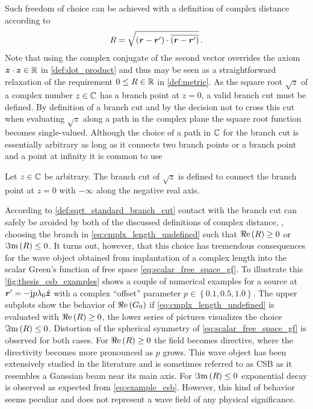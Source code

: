 Such freedom of choice can be achieved with a definition of complex distance
according to
\begin{equation}\label{eq:cmplx_length_undefined}
	R = \sqrt{\left(\rdiff\right) \cdot \overline{\left(\rdiff\right)}}
	\, .
\end{equation}
Note that using the complex conjugate of the second vector overrides the
axiom $\pvec{z} \cdot \pvec{z} \in \R$ in \cref{def:dot_product} and thus
may be seen as a straightforward relaxation of the requirement
$0 \leq R \in \mathbb{R}$ in \cref{def:metric}.
As the square root $\sqrt{z}$ of a complex number $z \in \mathbb{C}$ has a branch point
at $z = 0$, a valid branch cut must be defined.
By definition of a branch cut and by the decision not to cross this cut when
evaluating $\sqrt{z}$ along a path in the complex plane the square root function
becomes single-valued.
Although the choice of a path in $\mathbb{C}$ for the branch cut is essentially
arbitrary as long as it connects two branch points or a branch point and a
point at infinity it is common to use 
\cite[104]{Olver2010}\cite[\S\S2.2.3]{Chew1999}\cite[1066]{vanBladel2007}

\begin{definition}
	\label{def:sqrt_standard_branch_cut}
	Let $z \in \mathbb{C}$ be arbitrary.
	The branch cut of $\sqrt{z}$ is defined to connect the branch point at
	$z = 0$ with $-\infty$ along the negative real axis.
\end{definition}

According to \cref{def:sqrt_standard_branch_cut} contact with the branch cut can
safely be avoided by both of the discussed definitions of complex distance, \ie,
choosing the branch in \eqref{eq:cmplx_length_undefined} such that
$\Re\mathrm{e}\left(R\right) \geq 0$ or $\Im\mathrm{m}\left(R\right) \leq 0$.
It turns out, however, that this choice has tremendous consequences for the
wave object obtained from implantation of a complex length into the scalar
Green's function of free space \eqref{eq:scalar_free_space_gf}.
To illustrate this \cref{fig:thesis_csb_examples} shows a couple of numerical
examples for a source at $\rsrc = -\im p \lambda_0 \uv{z}$ with a complex
\enquote{offset} parameter 
$p \in \left\{\num{0.1}, \num{0.5}, \num{1.0}\right\}$.
The upper subplots show the behavior of $\Re\mathrm{e}\left(G_0\right)$ if
\eqref{eq:cmplx_length_undefined} is evaluated with $\Re\mathrm{e}\left(R\right) \geq 0$,
the lower series of pictures visualizes the choice $\Im\mathrm{m}\left(R\right) \leq 0$.
Distortion of the spherical symmetry of \eqref{eq:scalar_free_space_gf}
is observed for both cases.
For $\Re\mathrm{e}\left(R\right) \geq 0$ the field becomes directive, where the directivity
becomes more pronounced as $p$ grows.
This wave object has been extensively studied in the literature
\cite{Deschamps1971,Keller1971,Couture1981} and is sometimes referred to as
\ac{CSB} \cite{Hansen2009,Hansen2013} as it resembles a
Gaussian beam \cite[pp.~626]{hecht2017} near its main axis.
For $\Im\mathrm{m}\left(R\right) \leq 0$ exponential decay is observed as expected from
\eqref{eq:example_csb}.
However, this kind of behavior seems peculiar and does not represent a wave
field of any physical significance.

